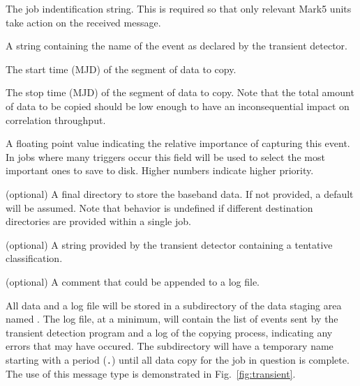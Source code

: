 \begin{description}
\begin{description}
\item{} The job indentification string.
This is required so that only relevant Mark5 units take action on the received message.
\item{} A string containing the name of the event as declared by the transient detector.
\item{} The start time (MJD) of the segment of data to copy.
\item{} The stop time (MJD) of the segment of data to copy.
Note that the total amount of data to be copied should be low enough to have an inconsequential impact on correlation throughput.
\item{} A floating point value indicating the relative importance of capturing this event.
In jobs where many triggers occur this field will be used to select the most important ones to save to disk.
Higher numbers indicate higher priority.
\item{} (optional) A final directory to store the baseband data.
If not provided, a default will be assumed.
Note that behavior is undefined if different destination directories are provided within a single job.
\item{} (optional) A string provided by the transient detector containing a tentative classification.
\item{} (optional) A comment that could be appended to a log file.
\end{description}

All data and a log file will be stored in a subdirectory of the data staging area named .
The log file, at a minimum, will contain the list of events sent by the transient detection program and a log of the copying process, indicating any errors that may have occured.
The subdirectory will have a temporary name starting with a period ({\tt .}) until all data copy for the job in question is complete.
The use of this message type is demonstrated in Fig.~\ref{fig:transient}.


\end{description}
